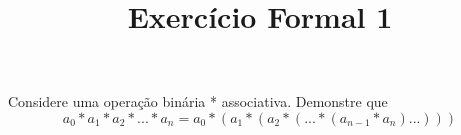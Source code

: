 \documentclass[12pt,a4paper]{article}
\title{Exercício Formal 1}
\begin{document}
Considere uma operação binária * associativa. Demonstre que
\begin{equation*}
a_{0}*a_{1}*a_{2}*...*a_{n} = a_{0}*(a_{1}*(a_{2}*(...*(a_{n-1}*a_{n})...)))
\end{equation*}
\end{document}
